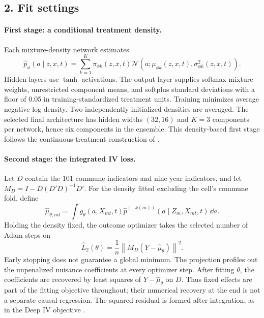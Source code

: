\subsection*{2. Fit settings}
\paragraph{First stage: a conditional treatment density.}
Each mixture-density network estimates
\begin{equation}
\widehat p_\phi(a\mid z,x,t)
=\sum_{k=1}^{K}\pi_{\phi k}(z,x,t)
\mathcal N\!\left(a;\mu_{\phi k}(z,x,t),\sigma_{\phi k}^2(z,x,t)\right).
\label{eq:neural-density}
\end{equation}
Hidden layers use $\tanh$ activations. The output layer supplies softmax mixture weights, unrestricted component means, and softplus standard deviations with a floor of 0.05 in training-standardized treatment units. Training minimizes average negative log density. Two independently initialized densities are averaged. The selected final architecture has hidden widths $(32,16)$ and $K=3$ components per network, hence six components in the ensemble. This density-based first stage follows the continuous-treatment construction of \cite[Section 3]{deepiv}.

\paragraph{Second stage: the integrated IV loss.}
Let $D$ contain the 101 commune indicators and nine year indicators, and let $M_D=I-D(D'D)^{-1}D'$. For the density fitted excluding the cell's commune fold, define
\begin{equation}
\widehat\mu_{\theta,mt}
=\int g_\theta(a,X_{mt},t)\widehat p^{(-k(m))}(a\mid Z_m,X_{mt},t)\,\dd a.
\end{equation}
Holding the density fixed, the outcome optimizer takes the selected number of Adam steps on
\begin{equation}
\widehat L_2(\theta)=\frac1n
\left\|M_D(Y-\widehat\mu_\theta)\right\|^2.
\label{eq:neural-loss}
\end{equation}
Early stopping does not guarantee a global minimum. The projection profiles out the unpenalized nuisance coefficients at every optimizer step. After fitting $\theta$, the coefficients are recovered by least squares of $Y-\widehat\mu_\theta$ on $D$. Thus fixed effects are part of the fitting objective throughout; their numerical recovery at the end is not a separate causal regression. The squared residual is formed after integration, as in the Deep IV objective \cite[eqs. (6)--(7)]{deepiv}.

